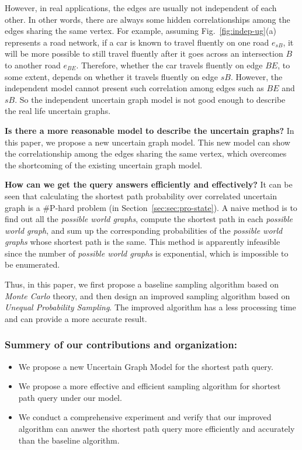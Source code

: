 \documentclass[runningheads,a4paper]{llncs}
\begin{document}
However, in real applications, the edges are usually not independent of each other. In other words, there are always some hidden correlationships among the edges sharing the same vertex. For example, assuming Fig.~\ref{fig:indep-ug}(a) represents a road network, if a car is known to travel fluently on one road $e_{sB}$, it will be more possible to still travel fluently after it goes across an intersection $B$ to another road $e_{BE}$. Therefore, whether the car travels fluently on edge $BE$, to some extent, depends on whether it travels fluently on edge $sB$. However, the independent model cannot present such correlation among edges such as $BE$ and $sB$. So the independent uncertain graph model is not good enough to describe the real life uncertain graphs.

\textbf{Is there a more reasonable model to describe the uncertain graphs?} In this paper, we propose a new uncertain graph model. This new model can show the correlationship among the edges sharing the same vertex, which overcomes the shortcoming of the existing uncertain graph model.

\textbf{How can we get the query answers efficiently and effectively?} It can be seen that calculating the shortest path probability over correlated uncertain graph is a \#P-hard problem (in Section~\ref{sec:sec:pro-state}). A naive method is to find out all the \emph{possible world graphs}, compute the shortest path in each \emph{possible world graph}, and sum up the corresponding probabilities of the \emph{possible world graphs} whose shortest path is the same. This method is apparently infeasible since the number of \emph{possible world graphs} is exponential, which is impossible to be enumerated.

Thus, in this paper, we first propose a baseline sampling algorithm based on \emph{Monte Carlo} theory, and then design an improved sampling algorithm based on \emph{Unequal Probability Sampling}. The improved algorithm has a less processing time and can provide a more accurate result.

\vspace{-0.5cm}
\subsubsection*{Summery of our contributions and organization:}

\begin{itemize}
\vspace{-0.2cm}
\item	We propose a new Uncertain Graph Model for the shortest path query.
\item   We propose a more effective and efficient sampling algorithm for shortest path query under our model.
\item   We conduct a comprehensive experiment and verify that our improved algorithm can answer the shortest path query more efficiently and accurately than the baseline algorithm.
\vspace{-0.2cm}
\end{itemize}
\end{document}
